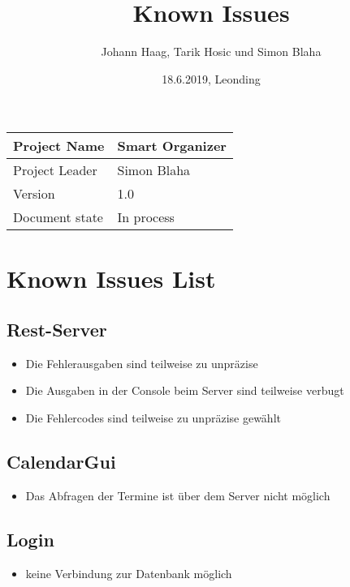 \documentclass[12pt]{scrartcl}
\title{Known Issues}
\author{Johann Haag, Tarik Hosic und Simon Blaha}
\date{18.6.2019, Leonding}
\begin{document}
    \maketitle
    \begin{flushleft}
    \begin{tabular}{|l|l|}
    \hline
    Project Name & Smart Organizer \\ \hline
    Project Leader & Simon Blaha \\ \hline
    Version & 1.0\\ \hline
    Document state & In process \\ \hline
    \end{tabular}
    \end{flushleft}

    \pagebreak
    \tableofcontents
    \pagebreak

    \section{Known Issues List}
    \subsection{Rest-Server}
    \begin{itemize}
        \item Die Fehlerausgaben sind teilweise zu unpräzise 
        \item Die Ausgaben in der Console beim Server sind teilweise verbugt 
        \item Die Fehlercodes sind teilweise zu unpräzise gewählt
    \end{itemize}

    \subsection{CalendarGui}
    \begin{itemize}
        \item Das Abfragen der Termine ist über dem Server nicht möglich
    \end{itemize}

    \subsection{Login}
    \begin{itemize}
        \item keine Verbindung zur Datenbank möglich
    \end{itemize}
\end{document}
